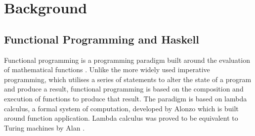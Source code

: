 \documentclass[../main.tex]{subfiles}
\begin{document}
\chapter{Background} \label{ch:background}






    \section{Functional Programming and Haskell}
        Functional programming is a programming paradigm built around the evaluation of
            mathematical functions \citep{fpPaulHudak}.
        Unlike the more widely used imperative programming, which utilises a series of
            statements to alter the state of a program and produce a result, functional
            programming is based on the composition and execution of functions to produce
            that result.
        The paradigm is based on lambda calculus, a formal system of computation,
            developed by Alonzo \citet{lambdaCalculus} which is built around function
            application.
        Lambda calculus was proved to be equivalent to Turing machines by Alan
            \citet{lambdaTuringComplete}.
\end{document}
